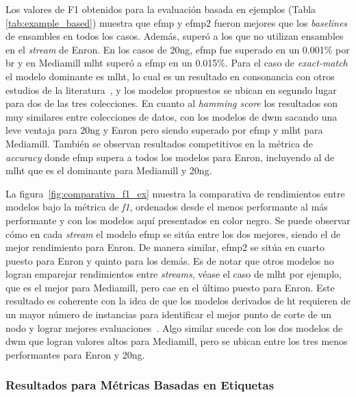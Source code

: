 Los valores de F1 obtenidos para la evaluación basada en ejemplos (Tabla
\ref{tab:example_based}) muestra que \acrshort{efmp} y \acrshort{efmp2} fueron
mejores que los \textit{baselines} de ensambles en todos los casos.  Además,
superó a los que no utilizan ensambles en el \textit{stream} de Enron.  En los
casos de 20ng, \acrshort{efmp} fue superado en un 0.001\% por \acrshort{br} y en
Mediamill \acrshort{mlht} superó a \acrshort{efmp} en un 0.015\%. Para el caso
de \textit{exact-match} el modelo dominante es \acrshort{mlht}, lo cual es un
resultado en consonancia con otros estudios de la
literatura~\cite{read_scalable_2012,osojnik_multi-label_2017,zheng_survey_2020},
y los modelos propuestos se ubican en segundo lugar para dos de las tres
colecciones. En cuanto al \textit{hamming score} los resultados son muy
similares entre colecciones de datos, con los modelos de \acrshort{dwm} sacando
una leve ventaja para 20ng y Enron pero siendo superado por \acrshort{efmp} y
\acrshort{mlht} para Mediamill. También se observan resultados competitivos en
la métrica de \textit{accuracy} donde \acrshort{efmp} supera a todos los modelos
para Enron, incluyendo al de \acrshort{mlht} que es el dominante para Mediamill
y 20ng.

La figura~\ref{fig:comparativa_f1_ex} muestra la comparativa de rendimientos
entre modelos bajo la métrica de \textit{f1}, ordenados desde el menos
performante al más performante y con los modelos aquí presentados en color
negro. Se puede observar cómo en cada \textit{stream} el modelo \acrshort{efmp}
se sitúa entre los dos mejores, siendo el de mejor rendimiento para Enron. De
manera similar, \acrshort{efmp2} se sitúa en cuarto puesto para Enron y quinto
para los demás. Es de notar que otros modelos no logran emparejar rendimientos
entre \textit{streams}, véase el caso de \acrshort{mlht} por ejemplo, que es el
mejor para Mediamill, pero cae en el último puesto para Enron. Este resultado es
coherente con la idea de que los modelos derivados de \acrlong{ht} requieren de
un mayor número de instancias para identificar el mejor punto de corte de un
nodo y lograr mejores evaluaciones~\cite{read_scalable_2012}. Algo similar
sucede con los dos modelos de \acrshort{dwm} que logran valores altos para
Mediamill, pero se ubican entre los tres menos performantes para Enron y 20ng.

\subsubsection{Resultados para Métricas Basadas en Etiquetas}

